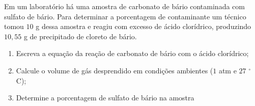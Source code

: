 Em um laboratório há uma amostra de carbonato de bário contaminada com sulfato de bário.
Para determinar a porcentagem de contaminante um técnico tomou $10$ g dessa amostra e reagiu com excesso de ácido clorídrico, produzindo $10,55$ g de precipitado de cloreto de bário.

\begin{enumerate}[label = (\alph*)]
	\item Escreva a equação da reação de carbonato de bário com o ácido clorídrico;
	\item Calcule o volume de gás desprendido em condições ambientes ($1$ atm e $27$ $^\circ$C);
	\item Determine a porcentagem de sulfato de bário na amostra
\end{enumerate}
